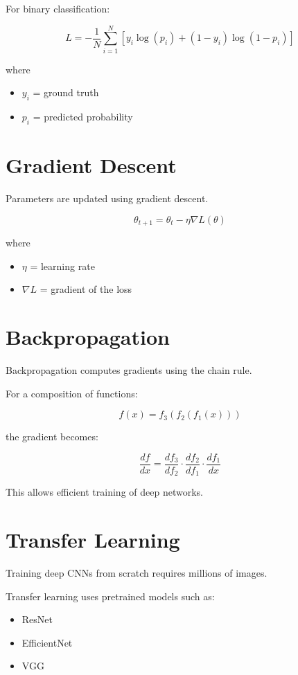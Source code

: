 \documentclass[11pt]{article}
\begin{document}
For binary classification:

\[
L = - \frac{1}{N} \sum_{i=1}^{N}
\left[y_i \log(p_i) + (1-y_i)\log(1-p_i)\right]
\]

where

\begin{itemize}
\item $y_i$ = ground truth
\item $p_i$ = predicted probability
\end{itemize}

\section{Gradient Descent}

Parameters are updated using gradient descent.

\[
\theta_{t+1} = \theta_t - \eta \nabla L(\theta)
\]

where

\begin{itemize}
\item $\eta$ = learning rate
\item $\nabla L$ = gradient of the loss
\end{itemize}

\section{Backpropagation}

Backpropagation computes gradients using the chain rule.

For a composition of functions:

\[
f(x) = f_3(f_2(f_1(x)))
\]

the gradient becomes:

\[
\frac{df}{dx} =
\frac{df_3}{df_2}
\cdot
\frac{df_2}{df_1}
\cdot
\frac{df_1}{dx}
\]

This allows efficient training of deep networks.

\section{Transfer Learning}

Training deep CNNs from scratch requires millions of images.

Transfer learning uses pretrained models such as:

\begin{itemize}
\item ResNet
\item EfficientNet
\item VGG
\end{itemize}
\end{document}
